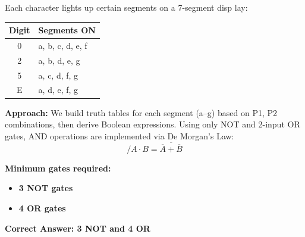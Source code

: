 \documentclass[12pt]{article}                                \usepackage{graphicx}                                        \usepackage{xcolor}
\begin{document}
Each character lights up certain segments on a 7-segment disp
lay:
                                                             \begin{center}
\begin{tabular}{|c|l|}                                       \hline
Digit & Segments ON \\
\hline                                                       0 & a, b, c, d, e, f \\
2 & a, b, d, e, g \\
5 & a, c, d, f, g \\                                         E & a, d, e, f, g \\
\hline
\end{tabular}
\end{center}

\vspace{1em}

\textbf{Approach:}
We build truth tables for each segment (a–g) based on P1, P2
combinations, then derive Boolean expressions. Using only NOT
 and 2-input OR gates, AND operations are implemented via De Morgan’s Law:
\[/
A \cdot B = \overline{\overline{A} + \overline{B}}
\]

\vspace{1em}

\textbf{Minimum gates required:}
\begin{itemize}
  \item \textbf{3 NOT gates}
  \item \textbf{4 OR gates}
\end{itemize}                                                                                                             \textbf{Correct Answer:  3 NOT and 4 OR}                                                                                  
\end{document}
